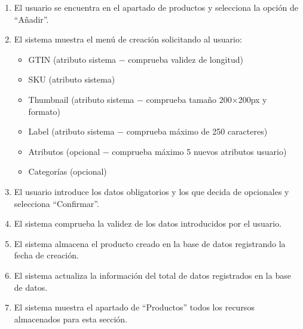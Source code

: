 \begin{enumerate}
    \item El usuario se encuentra en el apartado de productos y selecciona la opción de \enquote{Añadir}.
    \item El sistema muestra el menú de creación solicitando al usuario:
    \begin{itemize}
        \item GTIN (atributo sistema $-$ comprueba validez de longitud)
        \item SKU (atributo sistema)
        \item Thumbnail (atributo sistema $-$ comprueba tamaño 200$\times$200px y formato)
        \item Label (atributo sistema $-$ comprueba máximo de 250 caracteres)
        \item Atributos (opcional $-$ comprueba máximo 5 nuevos atributos usuario)
        \item Categorías (opcional)
    \end{itemize}
    \item El usuario introduce los datos obligatorios y los que decida de opcionales y selecciona \enquote{Confirmar}.
    \item El sistema comprueba la validez de los datos introducidos por el usuario.
    \item El sistema almacena el producto creado en la base de datos registrando la fecha de creación.
    \item El sistema actualiza la información del total de datos registrados en la base de datos.
    \item El sistema muestra el apartado de \enquote{Productos} todos los recursos almacenados para esta sección.
\end{enumerate}

